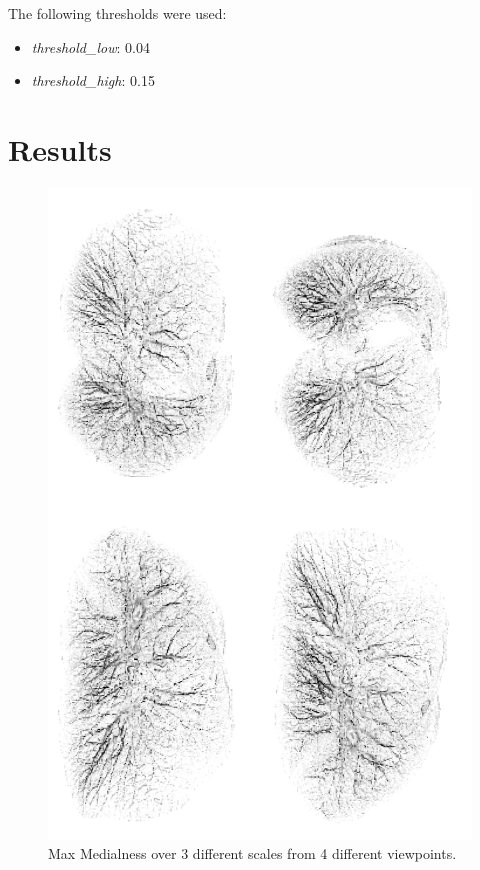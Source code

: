 The following thresholds were used:
\begin{itemize}
 \item \textit{threshold\_low}: 0.04
 \item \textit{threshold\_high}: 0.15
\end{itemize}




\newpage


\section{Results}

\begin{figure}[h!]
 \centering
 \includegraphics[width=14.5cm,keepaspectratio=true]{./figures/max-white.png}
 \caption{Max Medialness over 3 different scales from 4 different viewpoints.}
 \label{fig:max}
\end{figure}


